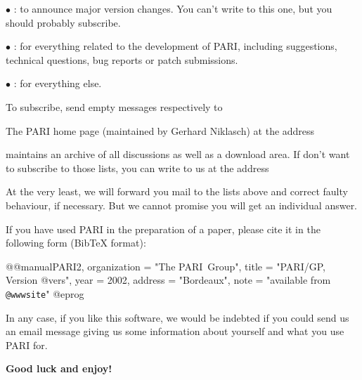 $\bullet$ : to announce major version changes.
You can't write to this one, but you should probably subscribe.

$\bullet$ : for everything related to the development
of PARI, including suggestions, technical questions, bug reports or patch
submissions.

 $\bullet$ : for everything else.

\noindent To subscribe, send empty messages respectively to

\centerline{}

\centerline{}

\centerline{}

\noindent The PARI home page (maintained by Gerhard Niklasch) at the address

\centerline{\wwwsite}

\noindent maintains an archive of all discussions as well as a download area.
If don't want to subscribe to those lists, you can write to us at the address

\centerline{}

\noindent At the very least, we will forward you mail to the lists above and
correct faulty behaviour, if necessary. But we cannot promise you will get an
individual answer.

If you have used PARI in the preparation of a paper, please cite it in the
following form (BibTeX format):

\def\@{@}
\bprog
@@manual{PARI2,
    organization = "{The PARI~Group}",
    title        = "{PARI/GP, Version @vers}",
    year         = 2002,
    address      = "Bordeaux",
    note         = "available from {\tt @wwwsite}"
}
@eprog
\smallskip

\noindent In any case, if you like this software, we would be indebted if you
could send us an email message giving us some information about yourself and
what you use PARI for.

\medskip
{\bf Good luck and enjoy!}
\vfill\eject

